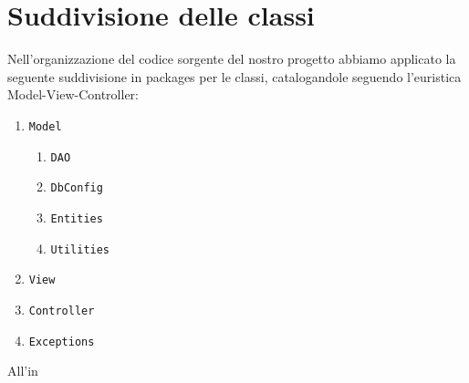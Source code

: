 \section{Suddivisione delle classi}
Nell'organizzazione del codice sorgente del nostro progetto abbiamo applicato la seguente suddivisione in packages per le classi, catalogandole seguendo l'euristica Model-View-Controller:
\begin{enumerate}
\item \texttt{Model}
\begin{enumerate}
\item \texttt{DAO}
\item \texttt{DbConfig}
\item \texttt{Entities}
\item \texttt{Utilities}
\end{enumerate}
\item \texttt{View}
\item \texttt{Controller}
\item \texttt{Exceptions}
\end{enumerate}

All'in
